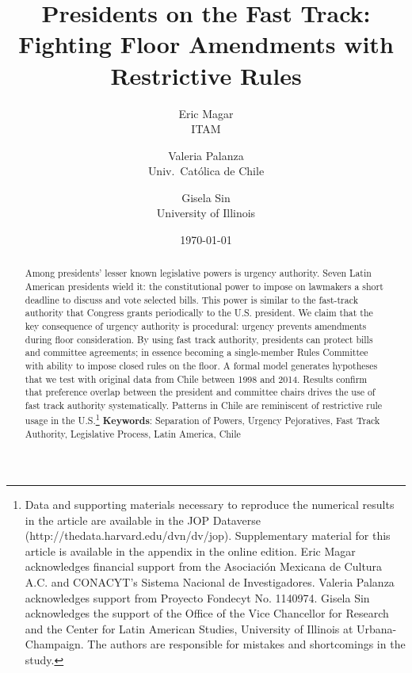 \documentclass[letter,12pt]{article}
\begin{document}
  

\title{Presidents on the Fast Track: Fighting Floor Amendments with Restrictive Rules}
\author{Eric Magar \\ ITAM \and
        Valeria Palanza \\ Univ.\ Católica de Chile \and  
        Gisela Sin \\ University of Illinois
}
\date{\today}
\maketitle


\newpage

\begin{abstract}
\noindent Among presidents’ lesser known legislative powers is urgency authority. Seven Latin American presidents wield it: the constitutional power to impose on lawmakers a short deadline to discuss and vote selected bills. This power is similar to the fast-track authority that Congress grants periodically to the U.S. president. We claim that the key consequence of urgency authority is procedural: urgency prevents amendments during floor consideration. By using fast track authority, presidents can protect bills and committee agreements; in essence becoming a single-member Rules Committee with ability to impose closed rules on the floor. A formal model generates hypotheses that we test with original data from Chile between 1998 and 2014. Results confirm that preference overlap between the president and committee chairs drives the use of fast track authority systematically. Patterns in Chile are reminiscent of restrictive rule usage in the U.S.\footnote{{Data and supporting materials necessary to reproduce the numerical results in the article are available in the JOP Dataverse (http://thedata.harvard.edu/dvn/dv/jop). Supplementary material for this article is available in the appendix in the online edition. Eric Magar acknowledges financial support from the Asociación Mexicana de Cultura A.C. and CONACYT’s Sistema Nacional de Investigadores. Valeria Palanza acknowledges support from Proyecto Fondecyt No. 1140974. Gisela Sin acknowledges the support of the Office of the Vice Chancellor for Research and the Center for Latin American Studies, University of Illinois at Urbana-Champaign. The authors are responsible for mistakes and shortcomings in the study.}}
\newline
\newline
\textbf{Keywords}: Separation of Powers, Urgency Pejoratives, Fast Track Authority, Legislative Process, Latin America, Chile
\end{abstract}
\end{document}
